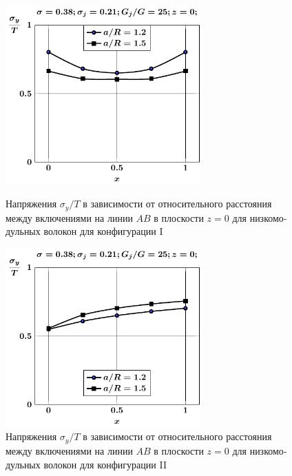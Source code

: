\begin{russian}
\begin{figure}[h!]
\centering\footnotesize
\parbox[b]{7.5cm}{\centering\includegraphics[width=7.5cm]{inc2a-a-h10-r10-g25-z0-sig_y.pdf}
\caption{Напряжения $\sigma_y/T$ в зависимости от относительного расстояния между включениями на линии $AB$ в плоскости $z=0$ для низкомодульных волокон для конфигурации I
\label{f:7:41}}}\hfil\hfil
\parbox[b]{7.5cm}{\centering\includegraphics[width=7.5cm]{inc2b-a-h10-r10-g25-z0-sig_y.pdf}
\caption{Напряжения $\sigma_y/T$ в зависимости от относительного расстояния между включениями на линии $AB$ в плоскости $z=0$ для низкомодульных волокон для конфигурации II
\label{f:7:42}}}
\end{figure}

%


\end{russian}
